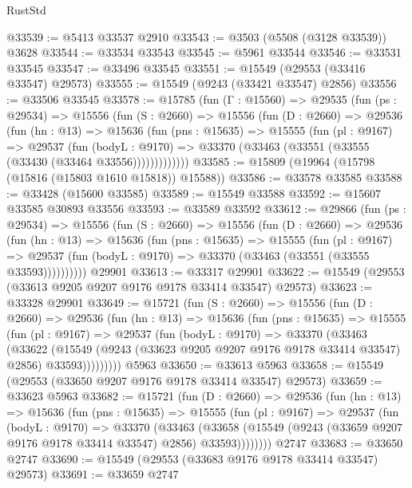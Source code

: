 \begin{lexlean}{RustStd}
\begin{coremodule}
@33539 := @5413 @33537 @2910
@33543 := @3503 (@5508 (@3128 @33539)) @3628
@33544 := @33534 @33543
@33545 := @5961 @33544
@33546 := @33531 @33545
@33547 := @33496 @33545
@33551 := @15549 (@29553 (@33416 @33547) @29573)
@33555 := @15549 (@9243 (@33421 @33547) @2856)
@33556 := @33506 @33545
@33578 := @15785
    (fun (Γ : @15560) =>
    @29535
      (fun (ps : @29534) =>
      @15556
        (fun (S : @2660) =>
        @15556
          (fun (D : @2660) =>
          @29536
            (fun (hn : @13) =>
            @15636
              (fun (pns : @15635) =>
              @15555
                (fun (pl : @9167) =>
                @29537
                  (fun (bodyL : @9170) =>
                  @33370 (@33463 (@33551 (@33555 (@33430 (@33464 @33556)))))))))))))
@33585 := @15809 (@19964 (@15798 (@15816 (@15803 @1610 @15818)) @15588))
@33586 := @33578 @33585
@33588 := @33428 (@15600 @33585)
@33589 := @15549 @33588
@33592 := @15607 @33585 @30893 @33556
@33593 := @33589 @33592
@33612 := @29866
    (fun (ps : @29534) =>
    @15556
      (fun (S : @2660) =>
      @15556
        (fun (D : @2660) =>
        @29536
          (fun (hn : @13) =>
          @15636
            (fun (pns : @15635) =>
            @15555
              (fun (pl : @9167) =>
              @29537 (fun (bodyL : @9170) => @33370 (@33463 (@33551 (@33555 @33593))))))))))
    @29901
@33613 := @33317 @29901
@33622 := @15549 (@29553 (@33613 @9205 @9207 @9176 @9178 @33414 @33547) @29573)
@33623 := @33328 @29901
@33649 := @15721
    (fun (S : @2660) =>
    @15556
      (fun (D : @2660) =>
      @29536
        (fun (hn : @13) =>
        @15636
          (fun (pns : @15635) =>
          @15555
            (fun (pl : @9167) =>
            @29537
              (fun (bodyL : @9170) =>
              @33370
                (@33463
                  (@33622
                    (@15549
                      (@9243 (@33623 @9205 @9207 @9176 @9178 @33414 @33547) @2856)
                      @33593)))))))))
    @5963
@33650 := @33613 @5963
@33658 := @15549 (@29553 (@33650 @9207 @9176 @9178 @33414 @33547) @29573)
@33659 := @33623 @5963
@33682 := @15721
    (fun (D : @2660) =>
    @29536
      (fun (hn : @13) =>
      @15636
        (fun (pns : @15635) =>
        @15555
          (fun (pl : @9167) =>
          @29537
            (fun (bodyL : @9170) =>
            @33370
              (@33463
                (@33658
                  (@15549 (@9243 (@33659 @9207 @9176 @9178 @33414 @33547) @2856) @33593))))))))
    @2747
@33683 := @33650 @2747
@33690 := @15549 (@29553 (@33683 @9176 @9178 @33414 @33547) @29573)
@33691 := @33659 @2747

\end{coremodule}
\end{lexlean}
